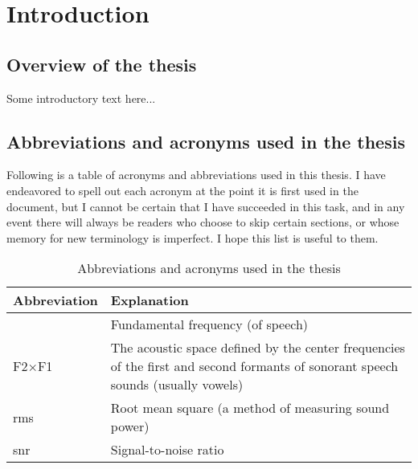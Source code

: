 \chapter{Introduction}
\section[Overview]{Overview of the thesis \label{sec:Overview}}
Some introductory text here...

\section[Abbreviations \& acronyms]{Abbreviations and acronyms used in the thesis \label{sec:Abbr}}
Following is a table of acronyms and abbreviations used in this thesis.  I have endeavored to spell out each acronym at the point it is first used in the document, but I cannot be certain that I have succeeded in this task, and in any event there will always be readers who choose to skip certain sections, or whose memory for new terminology is imperfect.  I hope this list is useful to them.

\begin{table}
	\caption[Abbreviations and acronyms]{Abbreviations and acronyms used in the thesis \label{tab:Abbr}}
	\centering
	\begin{tabu} to \textwidth [c]{X[c] X[5]}
		\toprule
		\rowfont[c]{\bfseries} Abbreviation & Explanation\\
		\midrule
		\fo & Fundamental frequency (of speech)\\
		F2×F1 & The acoustic space defined by the center frequencies of the first and second formants of sonorant speech sounds (usually vowels)\\
		\ac{rms} & Root mean square (a method of measuring sound power)\\
		\ac{snr} & Signal-to-noise ratio\\		
		\bottomrule
	\end{tabu}
\end{table}
